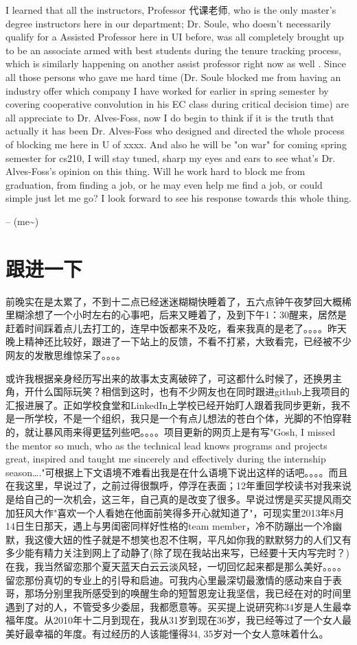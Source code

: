 \documentclass[12pt]{book}
\begin{document}
I learned that all the instructors, Professor 代课老师, who is the only master's degree instructors here in our department; Dr. Soule, who doesn't necessarily qualify for a Assisted Professor here in UI before, was all completely brought up to be an associate armed with best students during the tenure tracking process, which is similarly happening on another assist professor right now as well . Since all those persons who gave me hard time (Dr. Soule blocked me from having an industry offer which company I have worked for earlier in spring semester by covering cooperative convolution in his EC class during critical decision time) are all appreciate to Dr. Alves-Foss, now I do begin to think if it is the truth that actually it has been Dr. Alves-Foss who designed and directed the whole process of blocking me here in U of xxxx. And also he will be "on war" for coming spring semester for cs210, I will stay tuned, sharp my eyes and ears to see what's Dr. Alves-Foss's opinion on this thing. Will he work hard to block me from graduation, from finding a job, or he may even help me find a job, or could simple just let me go? I look forward to see his response towards this whole thing. 

-- (me\textasciitilde{})

\chapter{跟进一下}
\label{sec-30}

前晚实在是太累了，不到十二点已经迷迷糊糊快睡着了，五六点钟午夜梦回大概稀里糊涂想了一个小时左右的心事吧，后来又睡着了，及到下午1：30醒来，居然是赶着时间踩着点儿去打工的，连早中饭都来不及吃，看来我真的是老了。。。。昨天晚上精神还比较好，跟进了一下站上的反馈，不看不打紧，大致看完，已经被不少网友的发散思维惊呆了。。。。

或许我根据亲身经历写出来的故事太支离破碎了，可这都什么时候了，还换男主角，开什么国际玩笑？相信到这时，也有不少网友也在同时跟进github上我项目的汇报进展了。正如学校食堂和LinkedIn上学校已经开始盯人跟着我同步更新，我不是一所学校，不是一个组织，我只是一个有点儿想法的苍白个体，光脚的不怕穿鞋的，就让暴风雨来得更猛列些吧。。。。项目更新的网页上是有写"Gosh, I missed the mentor so much, who as the technical lead knows programs and projects great, inspired and taught me sincerely and effectively during the internship season…."可根据上下文语境不难看出我是在什么语境下说出这样的话吧。。。。而且在我这里，早说过了，之前过得很飘呼，停浮在表面；12年重回学校读书对我来说是给自己的一次机会，这三年，自己真的是改变了很多。早说过愣是买买提风雨交加狂风大作"喜欢一个人看她在他面前笑得多开心就知道了"，可现实里2013年8月14日生日那天，遇上与男闺密同样好性格的team member，冷不防蹦出一个冷幽默，我这傻大妞的性子就是不想笑也忍不住啊，平凡如你我的默默努力的人们又有多少能有精力关注到网上了动静了(除了现在我站出来写，已经要十天内写完时？)在我，我当然留恋那个夏天蓝天白云云淡风轻，一切回忆起来都是那么美好。。。。留恋那份真切的专业上的引导和启迪。可我内心里最深切最激情的感动来自于表哥，那场分别里我所感受到的唤醒生命的短暂恩宠让我坚信，我已经在对的时间里遇到了对的人，不管受多少委屈，我都愿意等。买买提上说研究称34岁是人生最幸福年度。从2010年十二月到现在，我从31岁到现在36岁，我已经等过了一个女人最美好最幸福的年度。有过经历的人该能懂得34, 35岁对一个女人意味着什么。
\end{document}
